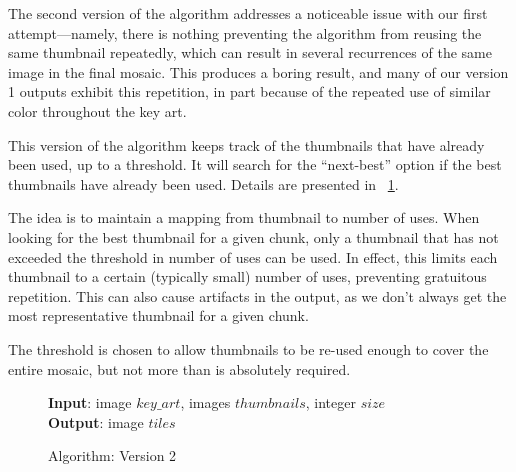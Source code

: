 \documentclass[11pt,conference]{IEEEtran}
\begin{document}
The second version of the algorithm addresses a noticeable issue with our first
attempt---namely, there is nothing preventing the algorithm from reusing the
same thumbnail repeatedly, which can result in several recurrences of the same
image in the final mosaic. This produces a boring result, and many of our
version 1 outputs exhibit this repetition, in part because of the repeated use
of similar color throughout the key art.

This version of the algorithm keeps track of the thumbnails that have already
been used, up to a threshold. It will search for the ``next-best'' option if the
best thumbnails have already been used. Details are presented in
\figurename~\ref{alg:v2}.

The idea is to maintain a mapping from thumbnail to number of uses. When looking
for the best thumbnail for a given chunk, only a thumbnail that has not exceeded
the threshold in number of uses can be used. In effect, this limits each
thumbnail to a certain (typically small) number of uses, preventing gratuitous
repetition. This can also cause artifacts in the output, as we don't always get
the most representative thumbnail for a given chunk.

The threshold is chosen to allow thumbnails to be re-used enough to cover the
entire mosaic, but not more than is absolutely required.

\begin{figure}[!t]
    \textbf{Input}: image \(key\_art\), images \(thumbnails\), integer \(size\) \\
    \textbf{Output}: image \(tiles\)
    \begin{algorithmic}
        \ENDIF
            \ENDFOR
            \ENDWHILE
        \ENDFOR
    \end{algorithmic}
    \caption{Algorithm: Version 2}\label{alg:v2}
\end{figure}
\end{document}
